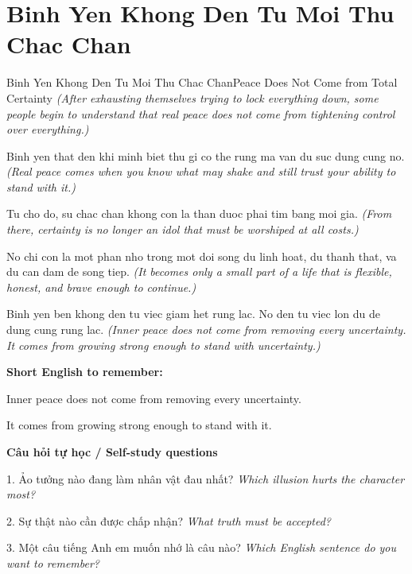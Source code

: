 \section{Binh Yen Khong Den Tu Moi Thu Chac Chan}
\begin{truyen}{Binh Yen Khong Den Tu Moi Thu Chac Chan}{Peace Does Not Come from Total Certainty}
\textit{(After exhausting themselves trying to lock everything down, some people begin to understand that real peace does not come from tightening control over everything.)}

Binh yen that den khi minh biet thu gi co the rung ma van du suc dung cung no.
\textit{(Real peace comes when you know what may shake and still trust your ability to stand with it.)}

Tu cho do, su chac chan khong con la than duoc phai tim bang moi gia.
\textit{(From there, certainty is no longer an idol that must be worshiped at all costs.)}

No chi con la mot phan nho trong mot doi song du linh hoat, du thanh that, va du can dam de song tiep.
\textit{(It becomes only a small part of a life that is flexible, honest, and brave enough to continue.)}

\end{truyen}

\begin{baihoc}
Binh yen ben khong den tu viec giam het rung lac. No den tu viec lon du de dung cung rung lac.
\textit{(Inner peace does not come from removing every uncertainty. It comes from growing strong enough to stand with uncertainty.)}
\end{baihoc}

\begin{ghinhoanh}
\textbf{Short English to remember:}

Inner peace does not come from removing every uncertainty.

It comes from growing strong enough to stand with it.

\end{ghinhoanh}

\begin{tuhocnhanh}
\textbf{Câu hỏi tự học / Self-study questions}

1. Ảo tưởng nào đang làm nhân vật đau nhất? \textit{Which illusion hurts the character most?}

2. Sự thật nào cần được chấp nhận? \textit{What truth must be accepted?}

3. Một câu tiếng Anh em muốn nhớ là câu nào? \textit{Which English sentence do you want to remember?}
\end{tuhocnhanh}
\ngancach


